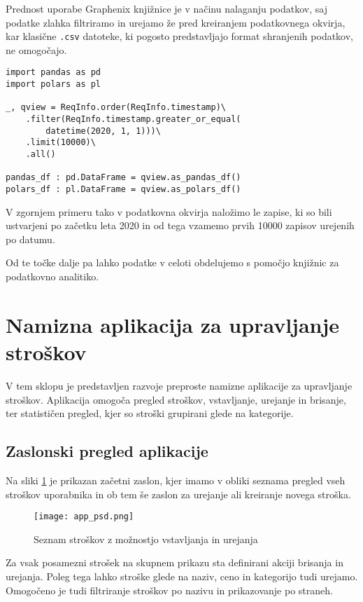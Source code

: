 \documentclass[a4paper,12pt,openright]{book}
\begin{document}
    Prednost uporabe Graphenix knjižnice je v načinu nalaganju podatkov, saj podatke zlahka filtriramo in urejamo že pred kreiranjem podatkovnega okvirja, kar klasične {\tt .csv} datoteke, ki pogosto predstavljajo format shranjenih podatkov, ne omogočajo.

\begin{verbatim}
import pandas as pd
import polars as pl

_, qview = ReqInfo.order(ReqInfo.timestamp)\
    .filter(ReqInfo.timestamp.greater_or_equal(
        datetime(2020, 1, 1)))\
    .limit(10000)\
    .all()

pandas_df : pd.DataFrame = qview.as_pandas_df()
polars_df : pl.DataFrame = qview.as_polars_df()
\end{verbatim}

    \noindent
    V zgornjem primeru tako v podatkovna okvirja naložimo le zapise, ki so bili ustvarjeni po začetku leta 2020 in od tega vzamemo prvih \num{10000} zapisov urejenih po datumu.

    Od te točke dalje pa lahko podatke v celoti obdelujemo s pomočjo knjižnic za podatkovno analitiko.

    \section{Namizna aplikacija za upravljanje stroškov}

    V tem sklopu je predstavljen razvoje preproste namizne aplikacije za upravljanje stroškov. Aplikacija omogoča pregled stroškov, vstavljanje, urejanje in brisanje, ter statističen pregled, kjer so stroški grupirani glede na kategorije.

    \subsection{Zaslonski pregled aplikacije}
    Na sliki \ref{home_screen} je prikazan začetni zaslon, kjer imamo v obliki seznama pregled vseh stroškov uporabnika in ob tem še zaslon za urejanje ali kreiranje novega stroška. 
    
    \begin{figure}[H]
        \centerline{\texttt{[image: app\_psd.png]}}
        \caption{Seznam stroškov z možnostjo vstavljanja in urejanja}
        \label{home_screen}
    \end{figure}

    \noindent
    Za vsak posamezni strošek na skupnem prikazu sta definirani akciji brisanja in urejanja. Poleg tega lahko stroške glede na naziv, ceno in kategorijo tudi urejamo. Omogočeno je tudi filtriranje stroškov po nazivu in prikazovanje po straneh.
\end{document}
